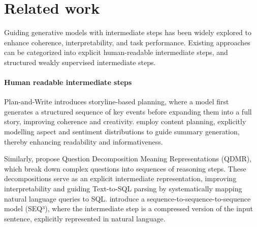 \section{Related work}
Guiding generative models with intermediate steps has been widely explored to enhance coherence, interpretability, and task performance. Existing approaches can be categorized into explicit human-readable intermediate steps, and structured weakly supervised intermediate steps.

\paragraph{Human readable intermediate steps}
Plan-and-Write \cite{Yao_Peng_Weischedel_Knight_Zhao_Yan_2019} introduces storyline-based planning, where a model first generates a structured sequence of key events before expanding them into a full story, improving coherence and creativity. %
\citeauthor{amplayo2020unsupervisedopinionsummarizationcontent} \citeyearpar{amplayo2020unsupervisedopinionsummarizationcontent} employ content planning, explicitly modelling aspect and sentiment distributions to guide summary generation, thereby enhancing readability and informativeness.

Similarly, \citeauthor{wolfson-etal-2022-weakly} \citeyearpar{wolfson-etal-2022-weakly} propose Question Decomposition Meaning Representations (QDMR), which break down complex questions into sequences of reasoning steps. These decompositions serve as an explicit intermediate representation, improving interpretability and guiding Text-to-SQL parsing by systematically mapping natural language queries to SQL.
\citeauthor{baziotis-etal-2019-seq} \citeyearpar{baziotis-etal-2019-seq}  introduce a sequence-to-sequence-to-sequence model (SEQ³), where the intermediate step is a compressed version of the input sentence, explicitly represented in natural language. 






